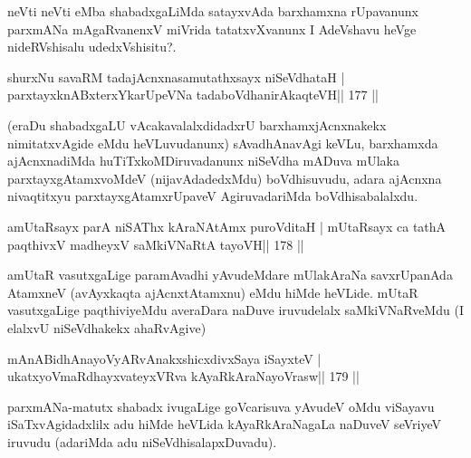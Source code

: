 \begin{artha}
neVti neVti eMba shabadxgaLiMda satayxvAda barxhamxna rUpavanunx parxmANa mAgaRvanenxV miVrida tatatxvXvanunx I AdeVshavu heVge nideRVshisalu udedxVshisitu?.
\end{artha}

\begin{shl}
shurxNu savaRM tadajAcnxnasamutathxsayx niSeVdhataH |
parxtayxknABxterxYkarUpeVNa tadaboVdhanirAkaqteVH\hfill || 177 ||
\end{shl}

\begin{artha}
(eraDu shabadxgaLU vAcakavalalxdidadxrU barxhamxjAcnxnakekx nimitatxvAgide eMdu heVLuvudanunx) sAvadhAnavAgi keVLu, barxhamxda ajAcnxnadiMda huTiTxkoMDiruvadanunx niSeVdha mADuva mUlaka parxtayxgAtamxvoMdeV (nijavAdadedxMdu)  boVdhisuvudu, adara ajAcnxna nivaqtitxyu parxtayxgAtamxrUpaveV AgiruvadariMda boVdhisabalalxdu.
\end{artha}


\begin{shl}
amUtaRsayx parA niSAThx kAraNAtAmx puroVditaH |
mUtaRsayx ca tathA paqthivxV madheyxV saMkiVNaRtA tayoVH\hfill || 178 ||
\end{shl}

\begin{artha}
amUtaR vasutxgaLige paramAvadhi yAvudeMdare mUlakAraNa savxrUpanAda
AtamxneV (avAyxkaqta ajAcnxtAtamxnu) eMdu hiMde heVLide. mUtaR
vasutxgaLige paqthiviyeMdu averaDara naDuve iruvudelalx saMkiVNaRveMdu
(I elalxvU niSeVdhakekx ahaRvAgive)
\end{artha}


\begin{shl}
mAnABidhAnayoVyARvAnakxshicxdivxSaya iSayxteV |
ukatxyoVmaRdhayxvateyxVRva kAyaRkAraNayoVrasw\hfill || 179 ||
\end{shl}

\begin{artha}
parxmANa-matutx shabadx ivugaLige goVcarisuva yAvudeV oMdu viSayavu iSaTxvAgidadxlilx adu hiMde heVLida kAyaRkAraNagaLa naDuveV seVriyeV iruvudu (adariMda adu niSeVdhisalapxDuvadu).
\end{artha}


